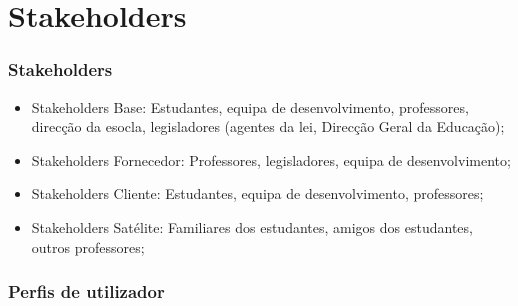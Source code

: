 \chapter{Stakeholders}
\label{chap:stake} 

\subsection{Stakeholders}

\begin{itemize}
	\item Stakeholders Base: Estudantes, equipa de desenvolvimento, professores, direcção da esocla, legisladores (agentes da lei, Direcção Geral da Educação);
	\item Stakeholders Fornecedor: Professores, legisladores, equipa de desenvolvimento;
	\item Stakeholders Cliente: Estudantes, equipa de desenvolvimento, professores;
	\item Stakeholders Satélite: Familiares dos estudantes, amigos dos estudantes, outros professores;
\end{itemize}

\subsection{Perfis de utilizador}

